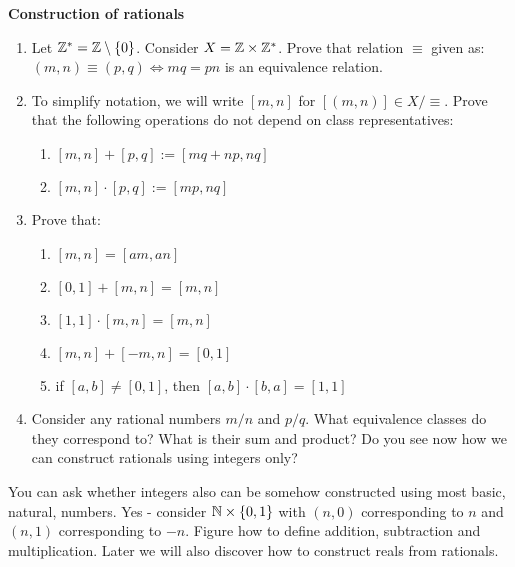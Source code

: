 \begin{exercise}
  \textbf{Construction of rationals}
  \begin{enumerate}
    \item Let $\mathbb Z^*=\mathbb Z\setminus\{0\}$. Consider $X=\mathbb Z\times \mathbb Z^*$. Prove that relation $\equiv$ given as: $(m,n)\equiv (p,q)\Leftrightarrow mq=pn$ is an equivalence relation.
    \item To simplify notation, we will write $[m,n]$ for $[(m,n)]\in X/\equiv$. Prove that the following operations do not depend on class representatives:
      \begin{enumerate}
        \item $[m,n] + [p,q] := [mq+np, nq]$
        \item $[m,n]\cdot [p,q] := [mp, nq]$
      \end{enumerate}
    \item Prove that:
      \begin{enumerate}
        \item $[m,n]=[am,an]$
        \item $[0,1]+[m,n]=[m,n]$
        \item $[1,1]\cdot [m,n]=[m,n]$
        \item $[m,n] + [-m,n]=[0,1]$
        \item if $[a,b]\neq [0,1]$, then $[a,b]\cdot [b,a]=[1,1]$
      \end{enumerate}
    \item Consider any rational numbers $m/n$ and $p/q$. What equivalence classes do they correspond to? What is their sum and product? Do you see now how we can construct rationals using integers only?
  \end{enumerate}
\end{exercise}
You can ask whether integers also can be somehow constructed using most basic, natural, numbers. Yes - consider $\mathbb N\times \{0,1\}$ with $(n,0)$ corresponding to $n$
and $(n,1)$ corresponding to $-n$. Figure how to define addition, subtraction and multiplication. Later we will also discover how to construct reals from rationals.
